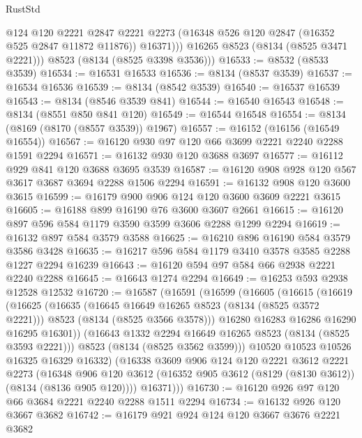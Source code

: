\begin{lexlean}{RustStd}
\begin{coremodule}
{\begin{coremodule}
{{{{{{{{{{{{{{{{{{{{{{{{{{{{{{{{{{{{{{{{{{{{{{{{{{{{{              @124
              @120
              @2221
              @2847
              @2221
              @2273
              (@16348 @526 @120 @2847 (@16352 @525 @2847 @11872 @11876))
              @16371)))
        @16265
        @8523
        (@8134 (@8525 @3471 @2221)))
      @8523
      (@8134 (@8525 @3398 @3536)))
@16533 := @8532 (@8533 @3539)
@16534 := @16531 @16533
@16536 := @8134 (@8537 @3539)
@16537 := @16534 @16536
@16539 := @8134 (@8542 @3539)
@16540 := @16537 @16539
@16543 := @8134 (@8546 @3539 @841)
@16544 := @16540 @16543
@16548 := @8134 (@8551 @850 @841 @120)
@16549 := @16544 @16548
@16554 := @8134 (@8169 (@8170 (@8557 @3539)) @1967)
@16557 := @16152 (@16156 (@16549 @16554))
@16567 := @16120 @930 @97 @120 @66 @3699 @2221 @2240 @2288 @1591 @2294
@16571 := @16132 @930 @120 @3688 @3697
@16577 := @16112 @929 @841 @120 @3688 @3695 @3539
@16587 := @16120 @908 @928 @120 @567 @3617 @3687 @3694 @2288 @1506 @2294
@16591 := @16132 @908 @120 @3600 @3615
@16599 := @16179 @900 @906 @124 @120 @3600 @3609 @2221 @3615
@16605 := @16188 @899 @16190 @76 @3600 @3607 @2661
@16615 := @16120 @897 @596 @584 @1179 @3590 @3599 @3606 @2288 @1299 @2294
@16619 := @16132 @897 @584 @3579 @3588
@16625 := @16210 @896 @16190 @584 @3579 @3586 @3428
@16635 := @16217 @596 @584 @1179 @3410 @3578 @3585 @2288 @1227 @2294 @16239
@16643 := @16120 @594 @97 @584 @66 @2938 @2221 @2240 @2288
@16645 := @16643 @1274 @2294
@16649 := @16253 @593 @2938 @12528 @12532
@16720 := @16587
    (@16591
      (@16599
        (@16605
          (@16615
            (@16619
              (@16625
                (@16635
                  (@16645 @16649 @16265 @8523 (@8134 (@8525 @3572 @2221)))
                  @8523
                  (@8134 (@8525 @3566 @3578)))
                @16280
                @16283
                @16286
                @16290
                @16295
                @16301))
            (@16643 @1332 @2294 @16649 @16265 @8523 (@8134 (@8525 @3593 @2221)))
            @8523
            (@8134 (@8525 @3562 @3599)))
          @10520
          @10523
          @10526
          @16325
          @16329
          @16332)
        (@16338
          @3609
          @906
          @124
          @120
          @2221
          @3612
          @2221
          @2273
          (@16348
            @906
            @120
            @3612
            (@16352 @905 @3612 (@8129 (@8130 @3612)) (@8134 (@8136 @905 @120))))
          @16371)))
@16730 := @16120 @926 @97 @120 @66 @3684 @2221 @2240 @2288 @1511 @2294
@16734 := @16132 @926 @120 @3667 @3682
@16742 := @16179 @921 @924 @124 @120 @3667 @3676 @2221 @3682
}}}}}}}}}}}}}}}}}}}}}}}}}}}}}}}}}}}}}}}}}}}}}}}}}}}}}
\end{coremodule}}
\end{coremodule}
\end{lexlean}
